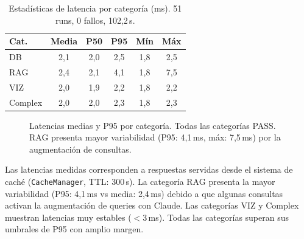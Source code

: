 \documentclass[11pt,a4paper,twocolumn]{article}
\begin{document}
\begin{table}[H]
\centering
\caption{Estad\'{i}sticas de latencia por categor\'{i}a (ms). 51 runs, 0 fallos, 102,2\,s.}
\label{tab:latencia}
\footnotesize
\begin{tabularx}{\columnwidth}{lccccc}
\toprule
\textbf{Cat.} & \textbf{Media} & \textbf{P50} & \textbf{P95} & \textbf{M\'{i}n} & \textbf{M\'{a}x} \\
\midrule
DB      & 2,1 & 2,0 & 2,5 & 1,8 & 2,5 \\
RAG     & 2,4 & 2,1 & 4,1 & 1,8 & 7,5 \\
VIZ     & 2,0 & 1,9 & 2,2 & 1,8 & 2,2 \\
Complex & 2,0 & 2,0 & 2,3 & 1,8 & 2,3 \\
\bottomrule
\end{tabularx}
\end{table}

\begin{figure}[H]
\centering
{}
\caption{Latencias medias y P95 por categor\'{i}a. Todas las categor\'{i}as PASS. RAG presenta mayor variabilidad (P95: 4,1\,ms, m\'{a}x: 7,5\,ms) por la augmentaci\'{o}n de consultas.}
\label{fig:latencia_barras}
\end{figure}

Las latencias medidas corresponden a respuestas servidas desde el sistema de cach\'{e} (\texttt{CacheManager}, TTL: 300\,s). La categor\'{i}a RAG presenta la mayor variabilidad (P95: 4,1\,ms vs media: 2,4\,ms) debido a que algunas consultas activan la augmentaci\'{o}n de queries con Claude. Las categor\'{i}as VIZ y Complex muestran latencias muy estables ($<$3\,ms). Todas las categor\'{i}as superan sus umbrales de P95 con amplio margen.
\end{document}
